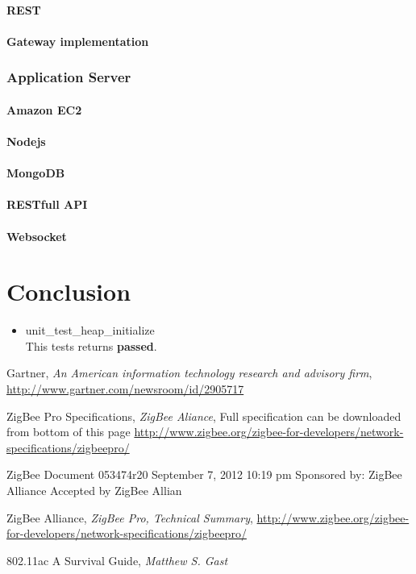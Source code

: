 \documentclass[a4paper,12pt,english]{article}
\begin{document}
\paragraph{REST}
\paragraph{Gateway implementation}

\subsubsection{Application Server}
\paragraph{Amazon EC2}
\paragraph{Nodejs}
\paragraph{MongoDB}
\paragraph{RESTfull API}
\paragraph{Websocket}

\section{Conclusion}

\begin{itemize}
  \item{unit\_test\_heap\_initialize}
    \\
    This tests returns \textbf{passed}.
\end{itemize}

\clearpage


\begin{thebibliography}{9}


  Gartner,
  \emph{ An American information technology research and advisory
  firm}, \url{http://www.gartner.com/newsroom/id/2905717}

ZigBee Pro Specifications,
\emph{ZigBee Aliance},
Full specification can
be downloaded from
bottom of this page
\url{http://www.zigbee.org/zigbee-for-developers/network-specifications/zigbeepro/}

ZigBee Document 053474r20
September 7, 2012 10:19 pm
Sponsored by: ZigBee Alliance
Accepted by ZigBee Allian

ZigBee Alliance,
\emph{ZigBee Pro, Technical Summary},
\url{http://www.zigbee.org/zigbee-for-developers/network-specifications/zigbeepro/}

802.11ac A Survival Guide,
\emph{Matthew S. Gast}

\end{thebibliography}
\end{document}
